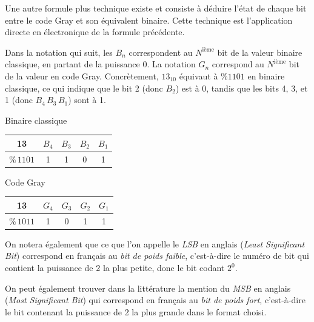 \documentclass[11pt,a4paper]{article}
\begin{document}
Une autre formule plus technique existe et consiste à déduire l'état de chaque bit entre le code Gray et son équivalent binaire.
Cette technique est l'application directe en électronique de la formule précédente.

\bigskip

Dans la notation qui suit, les $ B_{n} $ correspondent au $ N^{\text{ième}} $ bit de la valeur binaire classique, en partant de la puissance $ 0 $.
La notation $ G_{n} $ correspond au $ N^{\text{ième}} $ bit de la valeur en code Gray.
Concrètement, $ 13_{10} $ équivaut à $ \text{\%} 1101 $ en binaire classique, ce qui indique que le bit 2 (donc $ B_{2} $) est à 0, tandis que les bits 4, 3, et 1 (donc $ B_{4} \, B_{3} \, B_{1} $) sont à 1.


\begin{table}[!ht]
  \centering
  \begin{minipage}{0.45\textwidth}
    \centering
Binaire classique

\bigskip

\begin{tabular}{ c  | c | c | c | c | }
13                    & $B_{4}$ & $B_{3}$ & $B_{2}$ & $B_{1}$ \\
\hline
$ \text{\%} \, 1101 $ & 1 & 1 & 0 & 1 \\
\end{tabular}

  \end{minipage}
  \hfillx
  \begin{minipage}{0.45\textwidth}
    \centering
Code Gray

\bigskip

\begin{tabular}{ c  | c | c | c | c | }
13                    & $G_{4}$ & $G_{3}$ & $G_{2}$ & $G_{1}$ \\
\hline
$ \text{\%} \, 1011 $ & 1 & 0 & 1 & 1 \\
\end{tabular}

  \end{minipage}
\end{table}

\smallskip

On notera également que ce que l'on appelle le \textit{LSB} en anglais (\textit{Least Significant Bit}) correspond en français au \textit{bit de poids faible}, c'est-à-dire le numéro de bit qui contient la puissance de 2 la plus petite, donc le bit codant $ 2^{0} $.

On peut également trouver dans la littérature la mention du \textit{MSB} en anglais (\textit{Most Significant Bit}) qui correspond en français au \textit{bit de poids fort}, c'est-à-dire le bit contenant la puissance de 2 la plus grande dans le format choisi.
\end{document}
